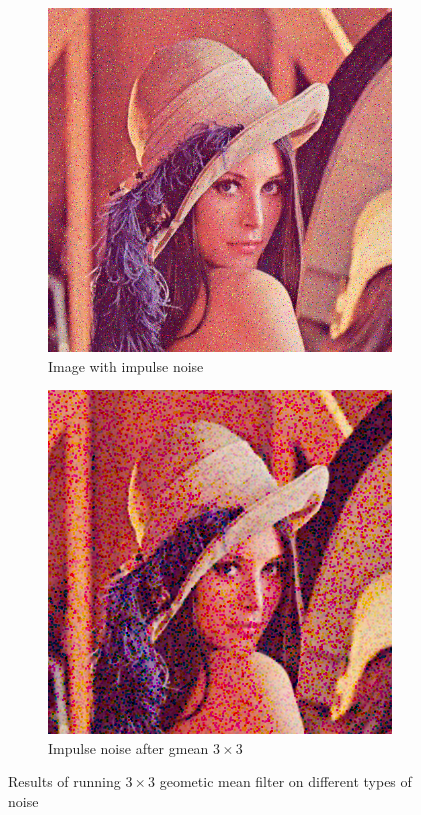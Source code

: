 \documentclass[12pt]{article}
\begin{document}
\begin{figure}[ht]
    \begin{subfigure}[t]{.4\textwidth}\centering
        \includegraphics[width=.8\textwidth]{lenac_impulse3}
        \caption{Image with impulse noise}
    \end{subfigure}
    \begin{subfigure}[t]{.4\textwidth}\centering
        \includegraphics[width=.8\textwidth]{lenac_impulse_gmean}
        \caption{Impulse noise after gmean $3\times3$}
    \end{subfigure}
    \caption{Results of running $3\times3$ geometic mean filter on different types of noise}
\end{figure}
\end{document}
